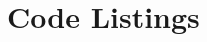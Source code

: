\documentclass[a4paper,10pt]{article}
\begin{document}
% 
% 

% 
% 
\appendix

\section{Code Listings}
\end{document}
